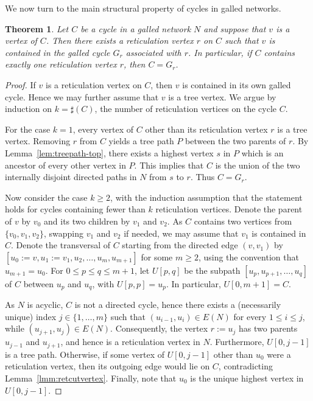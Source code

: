 \documentclass[pdflatex,sn-mathphys-num]{sn-jnl}
\newcommand{\nret}[1]{\sharp({#1})}
\theoremstyle{thmstyleone}%
\newtheorem{theorem}{Theorem}%
\theoremstyle{thmstyletwo}%
\theoremstyle{thmstylethree}%
\begin{document}
We now turn to the main structural property of cycles in galled networks.

\begin{theorem}\label{cycleandgalledcycle}
Let $C$ be a cycle in a galled network $N$ and suppose that $v$ is a vertex of $C$. Then there exists a reticulation vertex $r$ on $C$ such that $v$ is contained in the galled cycle $G_r$ associated with $r$. 
In particular, if $C$ contains exactly one reticulation vertex $r$, then 
$C=G_r$.
\end{theorem}

\begin{proof}
If $v$ is a reticulation vertex on $C$, then $v$ is contained in its own galled cycle. Hence we may further assume that $v$ is a tree vertex. We argue by induction on $k=\nret{C}$, the number of reticulation vertices on the cycle $C$. 

For the case $k=1$,  every vertex of $C$ other than its reticulation vertex $r$ is a tree vertex. 
Removing $r$ from $C$ yields a tree path $P$ between the two parents of $r$. By Lemma~\ref{lem:treepath-top}, 
there exists a highest vertex $s$ in $P$ which is an ancestor of every other vertex in $P$. This implies that 
$C$ is the union of the two internally disjoint directed paths in $N$ from $s$ to $r$. Thus $C=G_r$.


Now consider the case $k\ge 2$, with the induction assumption that the statement holds for cycles containing fewer than $k$ reticulation vertices.
Denote the parent of $v$ by $v_0$ and its two children by $v_1$ and $v_2$. As $C$ contains two vertices from $\{v_0,v_1,v_2\}$, swapping $v_1$ and $v_2$ if needed, we may assume that $v_1$ is contained in $C$. Denote the transversal of $C$ starting from the directed edge $(v,v_1)$ by $[u_0:=v,u_1:=v_1,u_2,\dots,u_m,u_{m+1}]$ for some $m\ge 2$, using the convention that $u_{m+1}=u_0$. 
For $0\leq p\le q \leq m+1$, let $U[p,q]$ be the subpath $[u_p,u_{p+1},\dots,u_q]$ of $C$ between $u_p$ and $u_q$, with $U[p,p]=u_p$. In particular, $U[0,m+1]=C$.


As $N$ is acyclic, $C$ is not a directed cycle, hence there exists a (necessarily unique) index $j\in\{1,\dots,m\}$ such that $(u_{i-1},u_i)\in E(N)$ for every $1\leq i\leq j$, while $(u_{j+1},u_j)\in E(N)$.
Consequently, the vertex $r := u_j$ has two parents  $u_{j-1}$ and $u_{j+1}$, and hence is a reticulation vertex in $N$. Furthermore, $U[0,j-1]$ is a tree path. Otherwise, if some vertex of $U[0,j-1]$ other than $u_0$ were a reticulation vertex, then its outgoing edge would lie on $C$, contradicting Lemma~\ref{lmm:retcutvertex}.
Finally, note that $u_0$ is the unique highest vertex in  $U[0,j-1]$.  


\end{proof}
\end{document}
